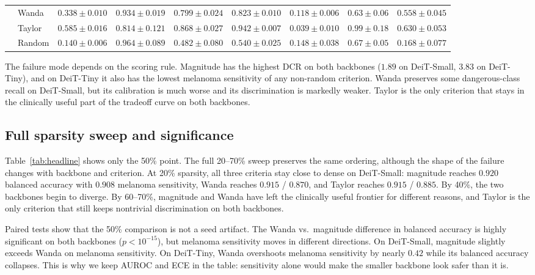 \documentclass{article}
\newcommand{\DCR}{\ensuremath{\mathrm{DCR}}}
\begin{document}
\begin{table}[t]
{\begin{tabular}{llccccccc}
 & Wanda       & $0.338 \pm 0.010$ & $0.934 \pm 0.019$ & $0.799 \pm 0.024$ & $0.823 \pm 0.010$ & $0.118 \pm 0.006$ & $0.63 \pm 0.06$ & $0.558 \pm 0.045$ \\
 & Taylor      & $0.585 \pm 0.016$ & $0.814 \pm 0.121$ & $0.868 \pm 0.027$ & $0.942 \pm 0.007$ & $0.039 \pm 0.010$ & $0.99 \pm 0.18$ & $0.630 \pm 0.053$ \\
 & Random      & $0.140 \pm 0.006$ & $0.964 \pm 0.089$ & $0.482 \pm 0.080$ & $0.540 \pm 0.025$ & $0.148 \pm 0.038$ & $0.67 \pm 0.05$ & $0.168 \pm 0.077$ \\
\bottomrule
\end{tabular}}
\end{table}

The failure mode depends on the scoring rule. Magnitude has the highest \DCR{} on both backbones ($1.89$ on DeiT-Small, $3.83$ on DeiT-Tiny), and on DeiT-Tiny it also has the lowest melanoma sensitivity of any non-random criterion. Wanda preserves some dangerous-class recall on DeiT-Small, but its calibration is much worse and its discrimination is markedly weaker. Taylor is the only criterion that stays in the clinically useful part of the tradeoff curve on both backbones.

\subsection{Full sparsity sweep and significance}
Table~\ref{tab:headline} shows only the 50\% point. The full 20--70\% sweep preserves the same ordering, although the shape of the failure changes with backbone and criterion. At 20\% sparsity, all three criteria stay close to dense on DeiT-Small: magnitude reaches $0.920$ balanced accuracy with $0.908$ melanoma sensitivity, Wanda reaches $0.915$ / $0.870$, and Taylor reaches $0.915$ / $0.885$. By 40\%, the two backbones begin to diverge. By 60--70\%, magnitude and Wanda have left the clinically useful frontier for different reasons, and Taylor is the only criterion that still keeps nontrivial discrimination on both backbones.

Paired tests show that the 50\% comparison is not a seed artifact. The Wanda vs.\ magnitude difference in balanced accuracy is highly significant on both backbones ($p < 10^{-15}$), but melanoma sensitivity moves in different directions. On DeiT-Small, magnitude slightly exceeds Wanda on melanoma sensitivity. On DeiT-Tiny, Wanda overshoots melanoma sensitivity by nearly $0.42$ while its balanced accuracy collapses. This is why we keep AUROC and ECE in the table: sensitivity alone would make the smaller backbone look safer than it is.
\end{document}
